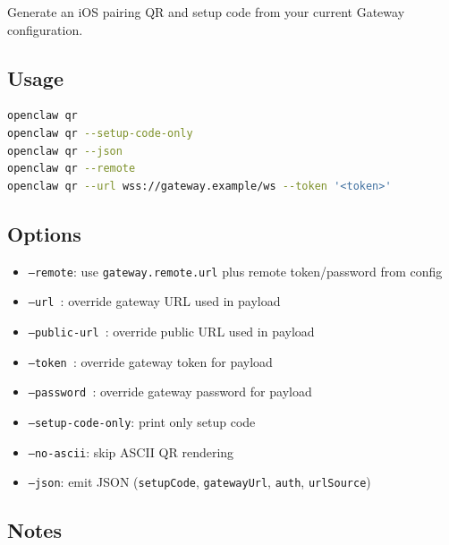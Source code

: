 Generate an iOS pairing QR and setup code from your current Gateway configuration.

\subsection{Usage}


\begin{lstlisting}[language=bash]
openclaw qr
openclaw qr --setup-code-only
openclaw qr --json
openclaw qr --remote
openclaw qr --url wss://gateway.example/ws --token '<token>'
\end{lstlisting}


\subsection{Options}


\begin{itemize}
  \item \texttt{--remote}: use \texttt{gateway.remote.url} plus remote token/password from config
  \item \texttt{--url }: override gateway URL used in payload
  \item \texttt{--public-url }: override public URL used in payload
  \item \texttt{--token }: override gateway token for payload
  \item \texttt{--password }: override gateway password for payload
  \item \texttt{--setup-code-only}: print only setup code
  \item \texttt{--no-ascii}: skip ASCII QR rendering
  \item \texttt{--json}: emit JSON (\texttt{setupCode}, \texttt{gatewayUrl}, \texttt{auth}, \texttt{urlSource})
\end{itemize}


\subsection{Notes}


